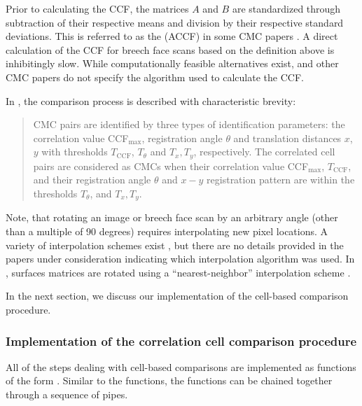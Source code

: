 Prior to calculating the CCF, the matrices \(A\) and \(B\) are
standardized through subtraction of their respective means and division
by their respective standard deviations. This is referred to as the
 (ACCF) in some CMC papers
\citep{ott_applying_2017}. A direct calculation of the CCF for breech
face scans based on the definition above is inhibitingly slow. While
computationally feasible alternatives exist, \citet{song_proposed_2013}
and other CMC papers do not specify the algorithm used to calculate the
CCF.

In \citet{song_3d_2014}, the comparison process is described with
characteristic brevity:

\begin{quote}
CMC pairs are identified by three types of identification parameters:
the correlation value CCF\(_{\max}\), registration angle \(\theta\) and
translation distances \(x\), \(y\) with thresholds \(T_{\text{CCF}}\),
\(T_\theta\) and \(T_x, T_y\), respectively. The correlated cell pairs
are considered as CMCs when their correlation value CCF\(_{\max}\),
\(T_{\text{CCF}}\), and their registration angle \(\theta\) and \(x-y\)
registration pattern are within the thresholds \(T_\theta\), and
\(T_x, T_y\).
\end{quote}

Note, that rotating an image or breech face scan by an arbitrary angle
(other than a multiple of 90 degrees) requires interpolating new pixel
locations. A variety of interpolation schemes exist
\citep{parker_comparison_1983}, but there are no details provided in the
papers under consideration indicating which interpolation algorithm was
used. In , surfaces matrices are rotated using a
``nearest-neighbor'' interpolation scheme \citep{imager}.

In the next section, we discuss our implementation of the cell-based
comparison procedure.

\hypertarget{implementation-of-the-correlation-cell-comparison-procedure}{%
\subsubsection{Implementation of the correlation cell comparison
procedure}\label{implementation-of-the-correlation-cell-comparison-procedure}}

All of the steps dealing with cell-based comparisons are implemented as
functions of the form . Similar to the
 functions, the  functions can
be chained together through a sequence of pipes.

